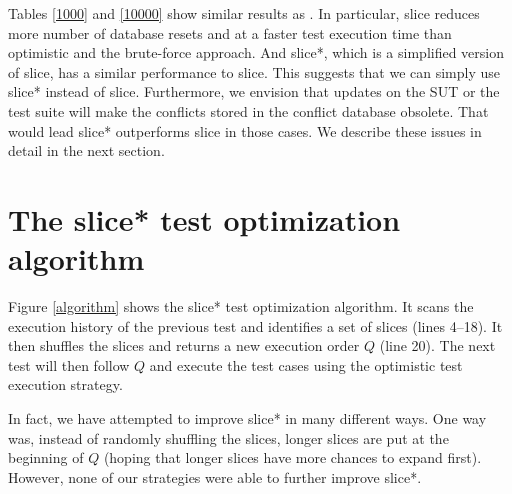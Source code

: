 \documentclass[authoryear,preprint,12pt]{elsarticle}
\begin{document}
Tables \ref{1000} and \ref{10000} show similar results as \cite{cidr05}.
In particular, {\sc slice} reduces more number of database resets and at a faster test execution time than
{\sc optimistic} and the brute-force approach.
And {\sc slice*}, which is a simplified version of {\sc slice}, has a similar performance to {\sc slice}.
This suggests that
we can simply use {\sc slice*} instead of {\sc slice}.
Furthermore, we envision that updates on the SUT or the test suite will make the conflicts stored in the 
conflict database obsolete.
That would lead {\sc slice*} outperforms {\sc slice} in those cases.
We describe these issues in detail in the next section.
  
\section{The {\sc slice*} test optimization algorithm}
   \label{slicestar}
   
Figure \ref{algorithm} shows the {\sc slice*} test optimization algorithm.
It scans the execution history of the previous test and identifies a set of slices (lines 4--18).
It then shuffles the slices and returns a new execution order $Q$ (line 20).
The next test will then follow $Q$ and execute the test cases using the {\sc optimistic} test execution strategy.

In fact, we have attempted to improve {\sc slice*} in many different ways.
One way was, instead of randomly shuffling the slices, 
longer slices are put at the beginning of $Q$ (hoping that longer slices have more chances to expand first).
However, none of our strategies were able to further improve {\sc slice*}.
\end{document}
